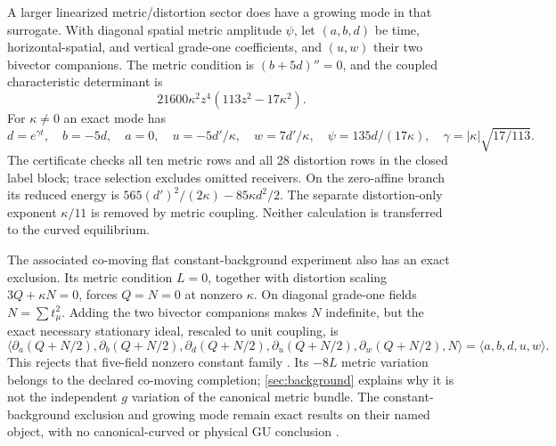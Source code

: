 A larger linearized metric/distortion sector does have a growing mode
in that surrogate. With diagonal spatial metric amplitude $\psi$, let
$(a,b,d)$ be time, horizontal-spatial, and vertical grade-one coefficients,
and $(u,w)$ their two bivector companions. The metric condition is
$(b+5d)''=0$, and the coupled characteristic determinant is
\begin{equation}
 21600\kappa^2z^4(113z^2-17\kappa^2).
 \label{eq:flatdet}
\end{equation}
For $\kappa\ne0$ an exact mode has
\begin{equation}
 d=e^{\gamma t},\quad b=-5d,\quad a=0,\quad
 u=-5d'/\kappa,\quad w=7d'/\kappa,\quad
 \psi=135d/(17\kappa),\quad
 \gamma=|\kappa|\sqrt{17/113}.\label{eq:flatmode}
\end{equation}
The certificate checks all ten metric rows and all 28 distortion rows
in the closed label block; trace selection excludes omitted receivers.
On the zero-affine branch its reduced energy is
$565(d')^2/(2\kappa)-85\kappa d^2/2$.
The separate distortion-only exponent $\kappa/11$ is removed by metric
coupling. Neither calculation is transferred to the curved equilibrium.

The associated co-moving flat constant-background experiment also has
an exact exclusion. Its metric condition $L=0$, together with distortion
scaling $3Q+\kappa N=0$, forces $Q=N=0$ at nonzero $\kappa$.
On diagonal grade-one fields $N=\sum t_\mu^2$.
Adding the two bivector companions makes $N$ indefinite, but the exact
necessary stationary ideal, rescaled to unit coupling, is
\begin{equation}
 \langle\partial_a(Q+N/2),\partial_b(Q+N/2),
 \partial_d(Q+N/2),\partial_u(Q+N/2),\partial_w(Q+N/2),N\rangle
 =\langle a,b,d,u,w\rangle.\label{eq:flatideal}
\end{equation}
This rejects that five-field nonzero constant family \cite{FlatConstant}.
Its $-8L$ metric variation belongs to the declared co-moving completion;
\cref{sec:background} explains why it is not the independent $g$
variation of the canonical metric bundle. The constant-background
exclusion and growing mode remain exact results on their named object,
with no canonical-curved or physical GU conclusion \cite{FlatScalar}.

